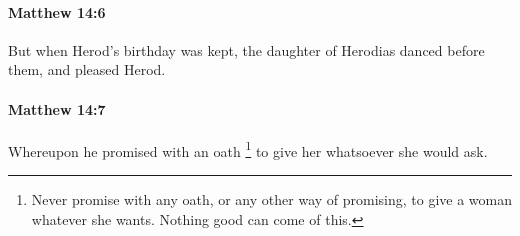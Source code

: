 		\paragraph{Matthew 14:6} %
			\label{MATTHEW-14-6}

			But when Herod's birthday was kept, the daughter of Herodias danced before them, and pleased Herod.

			\begin{framed}
			\scriptsize
				\begin{compactdesc}
					\item[SBLG] 
				\end{compactdesc}
			\end{framed}

		\paragraph{Matthew 14:7} %
			\label{MATTHEW-14-7}

			Whereupon he promised with an oath%
				\footnote{%
					Never promise with any oath, or any other way of promising, to give a woman whatever she wants. Nothing good can come of this.
					}
			to give her whatsoever she would ask.

